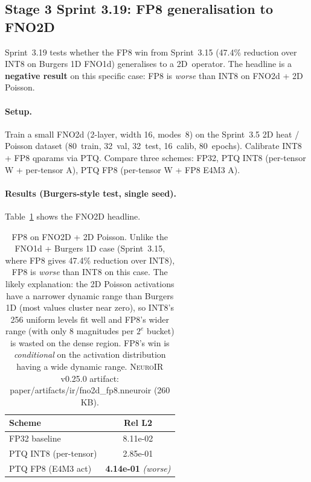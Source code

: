 \documentclass[10pt,twocolumn]{article}
\renewcommand{\texttt}[1]{{\normalfont\ttfamily #1}\normalfont\rmfamily}
\newcommand{\neuroir}{\textsc{NeuroIR}}
\begin{document}
\subsection{Stage 3 Sprint 3.19: FP8 generalisation to FNO2D}
\label{sec:fno2d-fp8}

Sprint~3.19 tests whether the FP8 win from
Sprint~3.15 (47.4\% reduction over INT8 on
Burgers 1D FNO1d) generalises to a 2D~operator.
The headline is a \textbf{negative result} on this
specific case: FP8 is \emph{worse} than INT8 on
FNO2d + 2D Poisson.

\paragraph{Setup.}
Train a small FNO2d (2-layer, width 16, modes~8)
on the Sprint~3.5 2D heat / Poisson dataset
(80~train, 32~val, 32~test, 16~calib, 80~epochs).
Calibrate INT8 + FP8 qparams via PTQ.  Compare
three schemes: FP32, PTQ INT8 (per-tensor W +
per-tensor A), PTQ FP8 (per-tensor W + FP8 E4M3
A).

\paragraph{Results (Burgers-style test, single seed).}
Table~\ref{tab:fno2d-fp8} shows the FNO2D
headline.

\begin{table}[h]
\centering
\begin{tabular}{lc}
\hline
\textbf{Scheme} & \textbf{Rel L2} \\
\hline
FP32 baseline & 8.11e-02 \\
PTQ INT8 (per-tensor) & 2.85e-01 \\
PTQ FP8 (E4M3 act) & \textbf{4.14e-01} \emph{(worse)} \\
\hline
\end{tabular}
\caption{FP8 on FNO2D + 2D Poisson.  Unlike the
FNO1d + Burgers 1D case (Sprint~3.15, where FP8
gives 47.4\% reduction over INT8), FP8 is
\emph{worse} than INT8 on this case.  The likely
explanation: the 2D Poisson activations have a
narrower dynamic range than Burgers 1D (most
values cluster near zero), so INT8's 256 uniform
levels fit well and FP8's wider range (with only
8 magnitudes per $2^e$ bucket) is wasted on the
dense region.  FP8's win is \emph{conditional} on
the activation distribution having a wide dynamic
range.
\neuroir{} v0.25.0 artifact:
\texttt{paper/artifacts/ir/fno2d\_fp8.nneuroir}
(260 KB).}
\label{tab:fno2d-fp8}
\end{table}
\end{document}
